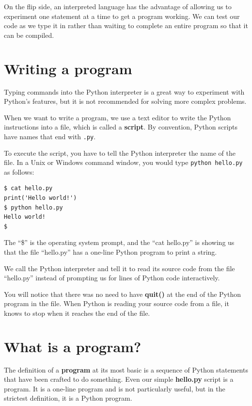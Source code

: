On the flip side, an interpreted language has the advantage of allowing us to experiment one statement at a time to get a program working. We can test our code as we type it in rather than waiting to complete an entire program so that it can be compiled.


\section{Writing a program}

Typing commands into the Python interpreter is a great way to experiment 
with Python's features, but it is not recommended for solving more complex problems.

When we want to write a program, 
we use a text editor to write the Python instructions into a file,
which is called a {\bf script}.  By
convention, Python scripts have names that end with {\tt .py}.


To execute the script, you have to tell the Python interpreter 
the name of the file.  In a Unix or Windows command window, 
you would type {\tt python hello.py} as follows:

\beforeverb
\begin{verbatim}
$ cat hello.py
print('Hello world!')
$ python hello.py
Hello world!
$
\end{verbatim}
\afterverb
%
The ``\$'' is the operating system prompt, and the ``cat hello.py'' is 
showing us that the file ``hello.py'' has a one-line Python program to print
a string.

We call the Python interpreter and tell it to read its source code from
the file ``hello.py'' instead of prompting us for lines of Python code
interactively.

You will notice that there was no need to have {\bf quit()} at the end of
the Python program in the file.   When Python is reading your source code
from a file, it knows to stop when it reaches the end of the file.

\section{What is a program?}

The definition of a {\bf program} at its most basic is a sequence
of Python statements that have been crafted to do something.
Even our simple {\bf hello.py} script is a program.  It is a one-line
program and is not particularly useful, but in the strictest definition,
it is a Python program.

